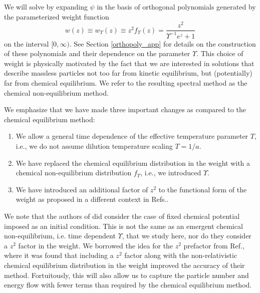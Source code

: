 We will solve  by expanding $\psi$ in the basis of orthogonal polynomials generated by the parameterized weight function
\begin{equation}\label{weight}
w(z)\equiv w_\Upsilon(z)\equiv z^2f_\Upsilon (z)=\frac{z^2}{\Upsilon^{-1} e^z+1}
\end{equation}
on the interval $[0,\infty)$. See Section \ref{orthopoly_app} for details on the construction of these polynomials and their dependence on the parameter $\Upsilon$. This choice of weight is physically motivated by the fact that we are interested in solutions that describe massless particles not too far from kinetic equilibrium, but (potentially) far from chemical equilibrium. We refer to the resulting spectral method as the chemical non-equilibrium method.

We emphasize that we have made three important changes as compared to  the chemical equilibrium method:
\begin{enumerate}
\item  We allow a general time dependence of the effective temperature parameter $T$, i.e., we do not assume dilution temperature scaling $T=1/a$.
\item We have replaced the chemical  equilibrium distribution in the weight   with a chemical non-equilibrium distribution  $f_\Upsilon $, i.e., we introduced $\Upsilon$.
\item We have introduced an additional factor of $z^2$ to the functional form of the weight as proposed in a different context in Refs.\cite{Wilkening,Wilkening2}. 
\end{enumerate} 
We note that the authors of \cite{Esposito:2000hi} did consider the case of fixed chemical potential imposed as an initial condition. This is not the same as an emergent chemical non-equilibrium, i.e. time dependent $\Upsilon$, that we study here, nor do they consider a $z^2$ factor in the weight. We borrowed the idea for the $z^2$ prefactor from   Ref.\cite{Wilkening2}, where it was found that including a $z^2$ factor along with the non-relativistic chemical equilibrium distribution in the weight improved the accuracy of their method. Fortuitously,  this will also allow us to capture the particle number and energy flow with fewer terms than required by the chemical equilibrium method. 

